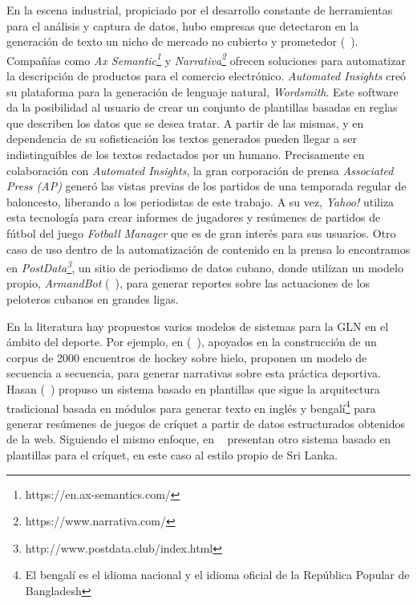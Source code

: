     En la escena industrial, propiciado por el desarrollo constante de herramientas para el análisis y captura de datos,
hubo empresas que detectaron en la generación de texto un nicho de mercado no cubierto y prometedor (~\cite{dale2020natural}). Compañías como \textit{Ax Semantic\footnote[1]{https://en.ax-semantics.com/}} y 
\textit{Narrativa\footnote[2]{https://www.narrativa.com/}} ofrecen soluciones para automatizar la descripción de productos para el comercio electrónico. 
\textit{Automated Insights} creó su plataforma para la generación de lenguaje natural, \textit{Wordsmith}. Este software da la posibilidad al usuario de crear un conjunto 
de plantillas basadas en reglas que describen los datos que se desea tratar. A partir de las mismas, y en dependencia de su sofisticación los textos generados pueden llegar a ser 
indistinguibles de los textos redactados por un humano. Precisamente en colaboración con \textit{Automated Insights}, la gran corporación de prensa \textit{Associated Press (AP)} generó
las vistas previas de los partidos de una temporada regular de baloncesto, liberando a los periodistas de este trabajo. A su vez, \textit{Yahoo!} utiliza esta tecnología para crear informes 
de jugadores y resúmenes de partidos de fútbol del juego \textit{Fotball Manager} que es de gran interés para sus usuarios. Otro caso de uso dentro de la automatización de contenido en la prensa lo encontramos en
\textit{PostData\footnote[3]{http://www.postdata.club/index.html}}, un sitio de periodismo 
de datos cubano, donde utilizan un modelo propio, \textit{ArmandBot} (~\cite{balboa2020}), para generar reportes sobre las actuaciones de los peloteros cubanos en grandes ligas.

    En la literatura hay propuestos varios modelos de sistemas para la GLN en el ámbito del deporte. Por ejemplo, en (~\cite{kanerva2019template}), apoyados en la construcción de un corpus de 2000 encuentros de hockey sobre hielo, 
proponen un modelo de secuencia a secuencia, para generar narrativas sobre esta práctica deportiva. Hasan (~\cite{hasan2011automatic}) propuso un sistema basado en plantillas que sigue la arquitectura tradicional basada en módulos para 
generar texto en inglés y bengalí\footnote[5]{El bengalí es el idioma nacional y el idioma oficial de la República Popular de Bangladesh} para generar resúmenes de juegos de críquet a partir de datos estructurados obtenidos de la web. 
Siguiendo el mismo enfoque, en ~\cite{gu2016incorporating} presentan otro sistema basado en plantillas para el críquet, en este caso al estilo propio de Sri Lanka.
 

